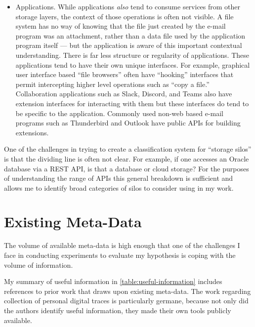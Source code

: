 \begin{itemize}
    \item Applications. While applications \emph{also} tend to consume services from other
          storage layers, the context of those operations is often not
          visible. A file system has no way of knowing that the file just
          created by the e-mail program was an attachment, rather than a data
          file used by the application program itself --- but the
          application is aware of this important contextual understanding.
          There is far less structure or
          regularity of applications.  These applications tend to have their
          own unique interfaces. For example, graphical user interface based
          ``file browsers'' often have ``hooking''
          interfaces that permit intercepting higher level operations such as ``copy
          a file.'' Collaboration applications such as Slack, Discord, and Teams
          also have extension interfaces for interacting with them but these
          interfaces do tend to be specific to the application.  Commonly used
          non-web based e-mail programs such as Thunderbird and Outlook have public
          APIs for building extensions.

\end{itemize}

One of the challenges in trying to create a classification system for ``storage
silos'' is that the dividing line is often not clear.  For example, if one
accesses an Oracle database via a REST API, is that a database or cloud storage?
For the purposes of understanding the range of APIs this general breakdown is
sufficient and allows me to identify broad categories of silos to consider using
in my work.

\section{Existing Meta-Data}
\label{ch:background:sec:meta-data}

The volume of available meta-data is high enough that one of the challenges I
face in conducting experiments to evaluate my hypothesis is coping with the
volume of information.

My summary of useful information in \autoref{table:useful-information} includes
references to prior work that draws upon existing meta-data. The work regarding
collection of personal digital traces is particularly germane, because not only
did the authors identify useful information, they made their own tools publicly
available.

